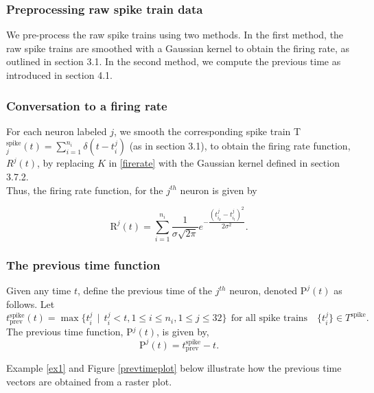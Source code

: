 \subsubsection{Preprocessing raw spike train data}
We pre-process the raw spike trains using two methods.
In the first method, the raw spike trains are smoothed with a Gaussian kernel to obtain the firing rate, as outlined in section 3.1. In the second method, we compute the previous time as introduced in section 4.1.\\


\subsubsection{Conversation to a firing rate}
For each neuron labeled $j$,  we smooth the corresponding spike train
T$^{\text{spike}}_{j}(t) = \displaystyle \sum_{i=1}^{n_{i}} \delta(t-t_{i}^{j})$ (as in section 3.1), to obtain the firing rate function,
 $R^{j}(t)$, by replacing $K$ in \eqref{firerate} with the  Gaussian kernel
defined in section 3.7.2. \\
Thus, the firing rate function, for the $j^{th}$ neuron is given by

\begin{equation} \label{jfirerate}
\text{R}^{j}(t) = \displaystyle \sum_{i=1}^{n_{i}}  \frac{1}{\sigma \sqrt{2\pi}} 
e^{-\dfrac{(t_{i_{k}}^{j}  - t_{i_{l}}^{j})^2}{2\sigma^2}}. 
\end{equation}

\subsubsection{The previous time function}
Given any time $t$, define the previous time of the $j^{th}$ neuron, denoted $\text{P}^{j}(t)$ as follows. Let 
\[
t^{\text{spike}}_{\text{prev}}(t) = \displaystyle \max  \{  t^{j}_{i} \ \ | \ \ t^{j}_{i} < t, 1 \leq i \leq n_{i}, 1 \leq j \leq 32 \} \ \ \text{for all spike trains} \quad  \{t^{j}_{i}\} \in T^{\text{spike}}.
\]
The previous time function, P$^{j}(t)$, is given by, 
\begin{equation}\label{prevtimefun}
\text{P}^{j}(t) = t^{\text{spike}}_{\text{prev}} - t.
\end{equation}


Example \eqref{ex1} and Figure \eqref{prevtimeplot} below illustrate how the previous time vectors are obtained from a raster plot.\\

